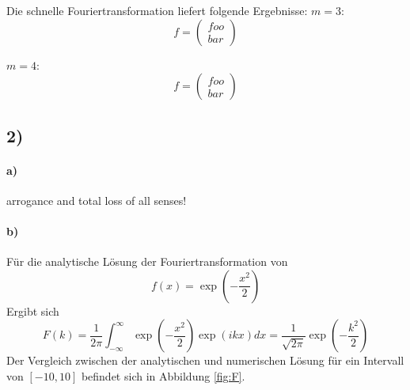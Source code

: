Die schnelle Fouriertransformation liefert folgende Ergebnisse:
$m = 3$:
\begin{equation}
    f =
    \begin{pmatrix}
        foo  \\
        bar 
    \end{pmatrix}
\end{equation}

$m = 4$:
\begin{equation}
    f =
    \begin{pmatrix}
        foo  \\
        bar 
    \end{pmatrix}
\end{equation}

\subsection*{2)} 
\paragraph*{a)}
arrogance and total loss of all senses!
\paragraph*{b)}
Für die analytische Lösung der Fouriertransformation von 
\begin{equation}
    f(x) = \exp{\left( - \frac{x^2}{2} \right)}
\end{equation}
Ergibt sich 
\begin{equation}
    F(k) = \frac{1}{2\pi} \int_{-\infty}^{\infty} \exp{\left( - \frac{x^2}{2} \right)} \exp{\left(i k x \right) } dx = \frac{1}{\sqrt{2 \pi}} \exp{\left( - \frac{k^2}{2} \right)}
\end{equation}
Der Vergleich zwischen der analytischen und numerischen Lösung für ein Intervall von $\left[-10, 10\right]$ befindet sich in Abbildung \ref{fig:F}.

